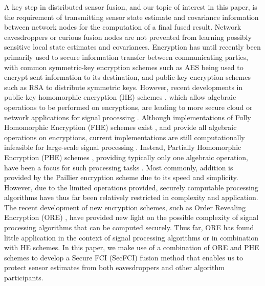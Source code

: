 \documentclass[letterpaper, 10 pt, conference]{ieeeconf}  %
\begin{document}
A key step in distributed sensor fusion, and our topic of interest in this paper, is the requirement of transmitting sensor state estimate and covariance information between network nodes for the computation of a final fused result. Network eavesdroppers or curious fusion nodes are not prevented from learning possibly sensitive local state estimates and covariances. Encryption has until recently been primarily used to secure information transfer between communicating parties, with common symmetric-key encryption schemes such as AES \cite{daemonAnnouncingAdvancedEncryption2001} being used to encrypt sent information to its destination, and public-key encryption schemes such as RSA \cite{rivestMethodObtainingDigital1978} to distribute symmetric keys. However, recent developments in public-key homomorphic encryption (HE) schemes \cite{gentryFullyHomomorphicEncryption2009,elgamalPublicKeyCryptosystem1985,paillierPublicKeyCryptosystemsBased1999}, which allow algebraic operations to be performed on encryptions, are leading to more secure cloud or network applications for signal processing \cite{lagendijkEncryptedSignalProcessing2012,alexandruEncryptedCooperativeControl2019,aristovEncryptedMultisensorInformation2018}. Although implementations of Fully Homomorphic Encryption (FHE) schemes exist \cite{gentryImplementingGentryFullyHomomorphic2011}, and provide all algebraic operations on encryptions, current implementations are still computationally infeasible for large-scale signal processing \cite{duImplementingMLAlgorithms2017,acarSurveyHomomorphicEncryption2018}. Instead, Partially Homomorphic Encryption (PHE) schemes \cite{elgamalPublicKeyCryptosystem1985,paillierPublicKeyCryptosystemsBased1999}, providing typically only one algebraic operation, have been a focus for such processing tasks \cite{alexandruEncryptedCooperativeControl2019,aristovEncryptedMultisensorInformation2018}. Most commonly, addition is provided by the Paillier encryption scheme \cite{paillierPublicKeyCryptosystemsBased1999} due to its speed and simplicity. However, due to the limited operations provided, securely computable processing algorithms have thus far been relatively restricted in complexity and application. The recent development of new encryption schemes, such as Order Revealing Encryption (ORE) \cite{chenettePracticalOrderRevealingEncryption2016,lewiOrderRevealingEncryptionNew2016,bogatovComparativeEvaluationOrderPreserving2018}, have provided new light on the possible complexity of signal processing algorithms that can be computed securely. Thus far, ORE has found little application in the context of signal processing algorithms or in combination with HE schemes. In this paper, we make use of a combination of ORE and PHE schemes to develop a Secure FCI (SecFCI) fusion method that enables us to protect sensor estimates from both eavesdroppers and other algorithm participants.
\end{document}
